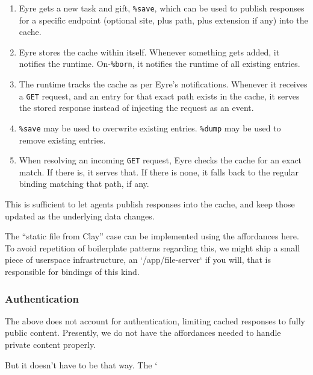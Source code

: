 \documentclass[twoside]{article}
\begin{document}
\begin{enumerate}
  \item  Eyre gets a new task and gift, \lstinline[style=inlinecode]{%save}, which can be used to publish responses for a specific endpoint (optional site, plus path, plus extension if any) into the cache.
  \item  Eyre stores the cache within itself. Whenever something gets added, it notifies the runtime. On-\lstinline[style=inlinecode]{%born}, it notifies the runtime of all existing entries.
  \item  The runtime tracks the cache as per Eyre's notifications. Whenever it receives a \texttt{GET} request, and an entry for that exact path exists in the cache, it serves the stored response instead of injecting the request as an event.
  \item  \lstinline[style=inlinecode]{%save} may be used to overwrite existing entries. \lstinline[style=inlinecode]{%dump} may be used to remove existing entries.
  \item  When resolving an incoming \texttt{GET} request, Eyre checks the cache for an exact match. If there is, it serves that. If there is none, it falls back to the regular binding matching that path, if any.
\end{enumerate}

This is sufficient to let agents publish responses into the cache, and keep those updated as the underlying data changes.

The ``static file from Clay'' case can be implemented using the affordances here. To avoid repetition of boilerplate patterns regarding this, we might ship a small piece of userspace infrastructure, an `/app/file-server` if you will, that is responsible for bindings of this kind.

\subsubsection{Authentication}

The above does not account for authentication, limiting cached responses to fully public content. Presently, we do not have the affordances needed to handle private content properly.

But it doesn't have to be that way. The `%
\end{document}

